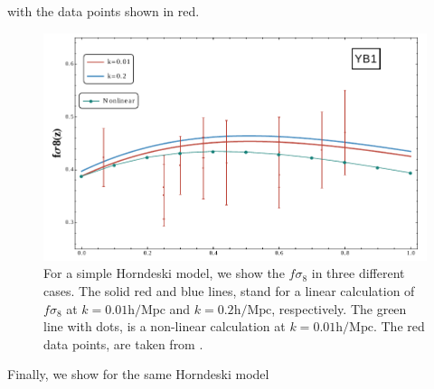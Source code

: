 with the data points shown in red.
\begin{figure}[tbph]
	\centering
	\includegraphics[width=0.7\linewidth]{Chapters/resummation-plots/fsigma8plot-preliminary-YB1.png}
	\caption[$f \sigma_{8}$ in Horndeski.]{For a simple Horndeski model,
		 we show the $f \sigma_{8}$ in three different cases. The solid red and blue lines, stand for a linear calculation of $f \sigma_{8}$ 
		 at $k=0.01 \mathrm{h/Mpc}$ and 
		$k=0.2 \mathrm{h/Mpc}$, respectively. The green line with dots, is a non-linear calculation at  $k=0.01 \mathrm{h/Mpc}$. The red data points,
	are taken from .}
	\label{fig:change-fsigma8-Y}
\end{figure}

Finally, we show for the same Horndeski model 




